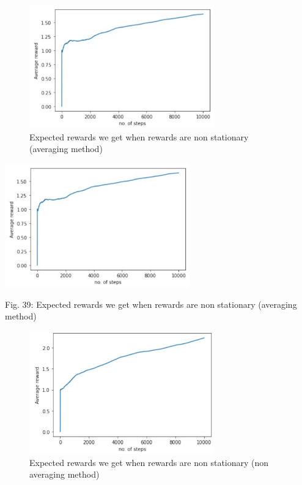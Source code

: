 \documentclass[15pt,journal]{IEEEtran}
\begin{document}
\begin{figure}[H]%
\begin {center}
\includegraphics[width=8cm]{images/lab9_4.PNG}
\caption{Expected rewards we get when rewards are non
stationary (averaging method)} 
\label{fig:ecg}
\end {center}
\end{figure}



\includegraphics[width=8cm]{images/lab9_4.PNG}

Fig. 39: Expected rewards we get when rewards are non
stationary (averaging method)

\begin{figure}[H]%
\begin {center}
\includegraphics[width=8cm]{images/lab9_5.PNG}
\caption{Expected rewards we get when rewards are non
stationary (non averaging method)} 
\label{fig:ecg}
\end {center}
\end{figure}
\end{document}
